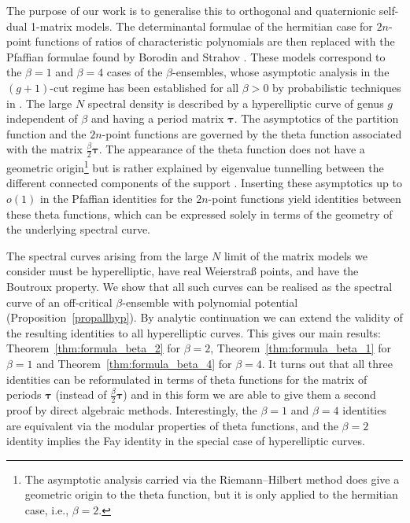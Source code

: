 \documentclass[10pt,a4paper]{amsart}
\numberwithin{equation}{section}
\begin{document}
The purpose of our work is to generalise this to orthogonal and quaternionic self-dual 1-matrix models. The determinantal formulae of the hermitian case for $2n$-point functions of ratios of characteristic polynomials are then replaced with the Pfaffian formulae found by Borodin and Strahov \cite{borodin_averages}. These models correspond to the $\beta = 1$ and $\beta = 4$ cases of the $\beta$-ensembles, whose asymptotic analysis in the $(g+1)$-cut regime has been established for all $\beta > 0$ by probabilistic techniques in \cite{BGmulti,BGK,Smulticut}. The large $N$ spectral density is described by a hyperelliptic curve of genus $g$ independent of $\beta$ and having a period matrix $\bm{\tau}$. The asymptotics of the partition function and the $2n$-point functions are governed by the theta function associated with the matrix $\frac{\beta}{2} \bm{\tau}$. The appearance of the theta function does not have a geometric origin\footnote{The asymptotic analysis carried via the Riemann--Hilbert method does give a geometric origin to the theta function, but it is only applied to the hermitian case, i.e., $\beta = 2$.} but is rather explained by eigenvalue tunnelling between the different connected components of the support \cite{BDE}. Inserting these asymptotics up to $o(1)$ in the Pfaffian identities for the $2n$-point functions yield identities between these theta functions, which can be expressed solely in terms of the geometry of the underlying spectral curve.

The spectral curves arising from the large $N$ limit of the matrix models we consider must be hyperelliptic, have real Weierstra\ss{} points, and have the Boutroux property. We show that all such curves can be realised as the spectral curve of an off-critical $\beta$-ensemble with polynomial potential (Proposition~\ref{propallhyp}). By analytic continuation we can extend the validity of the resulting identities to all hyperelliptic curves. This gives our main results: Theorem~\ref{thm:formula_beta_2} for $\beta = 2$, Theorem~\ref{thm:formula_beta_1} for $\beta = 1$ and Theorem~\ref{thm:formula_beta_4} for $\beta = 4$. It turns out that all three identities can be reformulated in terms of theta functions for the matrix of periods $\boldsymbol{\tau}$ \big(instead of $\frac{\beta}{2}\bm{\tau}$\big) and in this form we are able to give them a second proof by direct algebraic methods. Interestingly, the $\beta = 1$ and $\beta = 4$ identities are equivalent via the modular properties of theta functions, and the $\beta = 2$ identity implies the Fay identity in the special case of hyperelliptic curves.
\end{document}
